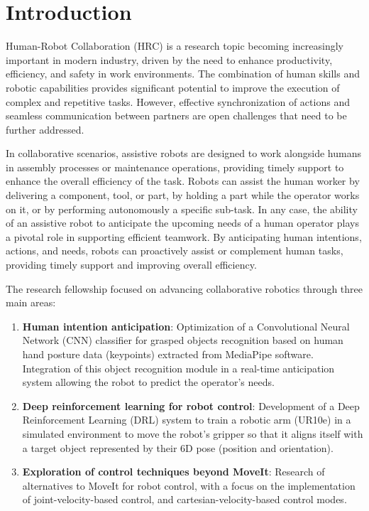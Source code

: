 \section{Introduction}

Human-Robot Collaboration (HRC) is a research topic becoming increasingly important in modern industry, driven by the need to enhance productivity, efficiency, and safety in work environments. The combination of human skills and robotic capabilities provides significant potential to improve the execution of complex and repetitive tasks. However, effective synchronization of actions and seamless communication between partners are open challenges that need to be further addressed.

In collaborative scenarios, assistive robots are designed to work alongside humans in assembly processes or maintenance operations, providing timely support to enhance the overall efficiency of the task. Robots can assist the human worker by delivering a component, tool, or part, by holding a part while the operator works on it, or by performing autonomously a specific sub-task. In any case, the ability of an assistive robot to anticipate the upcoming needs of a human operator plays a pivotal role in supporting efficient teamwork. By anticipating human intentions, actions, and needs, robots can proactively assist or complement human tasks, providing timely support and improving overall efficiency.

The research fellowship focused on advancing collaborative robotics through three main areas:
\begin{enumerate}
    \item \textbf{Human intention anticipation}: Optimization of a Convolutional Neural Network (CNN) classifier\cite{Amaral2023} for grasped objects recognition based on human hand posture data (keypoints) extracted from MediaPipe software. Integration of this object recognition module in a real-time anticipation system allowing the robot to predict the operator's needs.

    \item \textbf{Deep reinforcement learning for robot control}: Development of a Deep Reinforcement Learning (DRL) system to train a robotic arm (UR10e) in a simulated environment to move the robot's gripper so that it aligns itself with a target object represented by their 6D pose (position and orientation).

    \item \textbf{Exploration of control techniques beyond MoveIt}: Research of alternatives to MoveIt for robot control, with a focus on the implementation of joint-velocity-based control, and cartesian-velocity-based control modes.
\end{enumerate}

